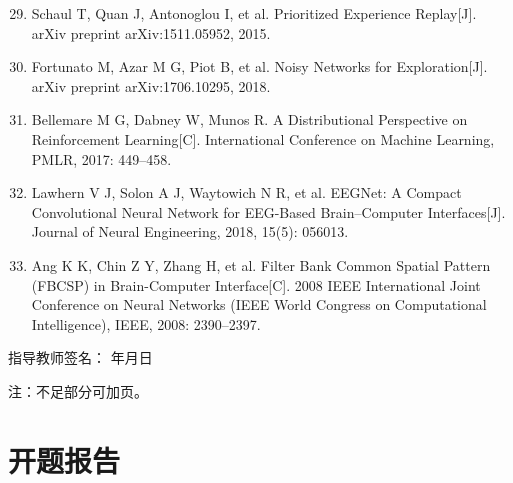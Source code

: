 \documentclass[12pt,a4paper]{ctexart}
\begin{document}

\begin{enumerate}
  \setcounter{enumi}{28}
  \item Schaul T, Quan J, Antonoglou I, et al. Prioritized Experience Replay[J]. arXiv preprint arXiv:1511.05952, 2015.
  \item Fortunato M, Azar M G, Piot B, et al. Noisy Networks for Exploration[J]. arXiv preprint arXiv:1706.10295, 2018.
  \item Bellemare M G, Dabney W, Munos R. A Distributional Perspective on Reinforcement Learning[C]. International Conference on Machine Learning, PMLR, 2017: 449--458.
\end{enumerate}


\begin{enumerate}
  \setcounter{enumi}{31}
  \item Lawhern V J, Solon A J, Waytowich N R, et al. EEGNet: A Compact Convolutional Neural Network for EEG-Based Brain--Computer Interfaces[J]. Journal of Neural Engineering, 2018, 15(5): 056013.
  \item Ang K K, Chin Z Y, Zhang H, et al. Filter Bank Common Spatial Pattern (FBCSP) in Brain-Computer Interface[C]. 2008 IEEE International Joint Conference on Neural Networks (IEEE World Congress on Computational Intelligence), IEEE, 2008: 2390--2397.
\end{enumerate}
\vspace{1cm}

\noindent 指导教师签名：\underline{\hspace{3cm}} \hspace{1cm} \underline{\hspace{1cm}} 年\underline{\hspace{1cm}}月\underline{\hspace{1cm}}日

\noindent 注：不足部分可加页。

\newpage

\section*{开题报告}
\end{document}

